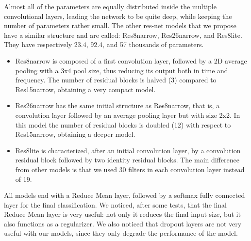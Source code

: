 Almost all of the parameters are equally distributed inside the multiple convolutional layers, leading the network to be quite deep, while keeping the number of parameters rather small.
The other res-net models that we propose have a similar structure and are called: Res8narrow, Res26narrow, and Res8lite. They have respectively 23.4, 92.4, and 57 thousands of parameters.
\begin{itemize}
  \item Res8narrow is composed of a first convolution layer, followed by a 2D average pooling with a 3x4 pool size, thus reducing its output both in time and frequency.
The number of residual blocks is halved (3) compared to Res15narrow, obtaining a very compact model.

  \item Res26narrow has the same initial structure as Res8narrow, that is, a convolution layer followed by an average pooling layer but with size 2x2. 
In this model the number of residual blocks is doubled (12) with respect to Res15narrow, obtaining a deeper model.

  \item Res8lite is characterized, after an initial convolution layer, by a convolution residual block followed by two identity residual blocks. The main difference from other models is that we used 30 filters in each convolution layer instead of 19. 

\end{itemize}
All models end with a Reduce Mean layer, followed by a softmax fully connected layer for the final classification.
We noticed, after some tests, that the final Reduce Mean layer is very useful: not only it  reduces the final input size, but it also functions as a regularizer. We also noticed that dropout layers are not very useful with our models, since they only degrade the performance of the model.

